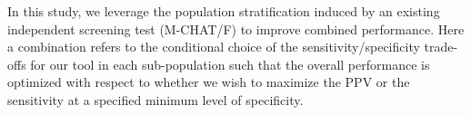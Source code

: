 \documentclass[onecolumn, compsoc,11pt]{IEEEtran}
\makeatletter
\renewcommand\subsection{\@startsection {subsection}{2}{\z@}%
                                   {0ex \@plus -1.75ex \@minus -1.2ex}%
                                   {0ex \@plus.0ex}%
                                   {\fontsize{11}{11}\selectfont\bfseries\sffamily\color{black}}}
\renewcommand{\captionN}[1]{\caption{\color{CadetBlue4!80!black} \sffamily \fontsize{9}{10}\selectfont #1  }}
\makeatother
\begin{document}
In this study, we leverage the population stratification induced by an existing independent screening test (M-CHAT/F) to improve combined performance. Here a combination  refers to the conditional choice of the sensitivity/specificity trade-offs for our tool in each sub-population such that the overall performance is optimized with respect to whether we wish to maximize the PPV or the sensitivity at a specified minimum level of specificity.
%
\end{document}
